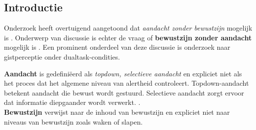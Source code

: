 \documentclass[a0,portrait]{a0poster}
\begin{document}

\begin{multicols}{3} %


\color{Black} %
\section*{Introductie}
Onderzoek heeft overtuigend aangetoond dat \textit{aandacht zonder bewustzijn} mogelijk is \nocite{Jiang_Costello_Fang_Huang_He_2006, Sklar_Levy_Goldstein_Mandel_Maril_Hassin_2012, Cohen_Cavanagh_Chun_Nakayama_2012, Reddy_Reddy_Koch_2006, LiVanRullenKochPerona2002}. Onderwerp van discussie is echter de vraag of \textbf{bewustzijn zonder aandacht} mogelijk is \nocite{Cohen_Cavanagh_Chun_Nakayama_2012,Mack_Clarke_2012, Jennings_2015, Block_2011, Cohen_Dennett_2011, VanBoxtel_Tsuchiya_Koch_2010}. Een prominent onderdeel van deze discussie is onderzoek naar gistperceptie onder dualtask-condities. \nocite{Mack_Clarke_2012}
\nocite{VanBoxtel_Tsuchiya_Koch_2010}\nocite{Alvarez_Oliva_2008}\\
\begin{framed}
\textbf{Aandacht} is gedefini\"eerd als \textit{topdown, selectieve aandacht} en expliciet niet als het proces dat het algemene niveau van alertheid controleert. Topdown-aandacht betekent aandacht die bewust wordt gestuurd. Selectieve aandacht zorgt ervoor dat informatie diepgaander wordt verwerkt. \cite{Cohen_Cavanagh_Chun_Nakayama_2012}.\\
\textbf{Bewustzijn} verwijst naar de inhoud van bewustzijn en expliciet niet naar niveaus van bewustzijn zoals waken of slapen.
\end{framed}
\color{Black} %

\end{multicols}
\end{document}
